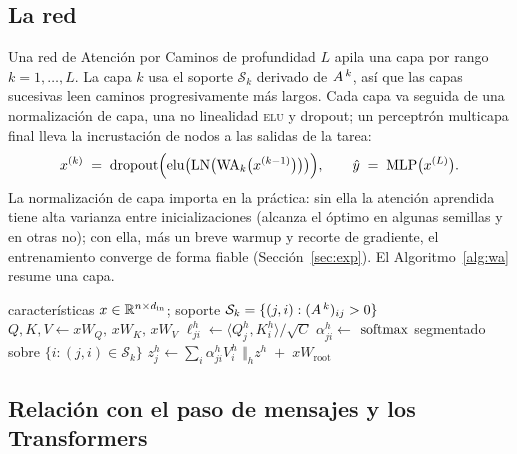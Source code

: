 \subsection{La red}

Una red de Atención por Caminos de profundidad $L$ apila una capa por rango
$k=1,\dots,L$. La capa $k$ usa el soporte $\mathcal{S}_k$ derivado de
$A^{\,k}$, así que las capas sucesivas leen caminos progresivamente más largos. Cada
capa va seguida de una normalización de capa, una no linealidad \textsc{elu} y
dropout; un perceptrón multicapa final lleva la incrustación de nodos a las salidas de la tarea:
\[
  x^{(k)} \;=\; \mathrm{dropout}\Bigl(\mathrm{elu}\bigl(\mathrm{LN}\bigl(
  \mathrm{WA}_k\bigl(x^{(k-1)}\bigr)\bigr)\bigr)\Bigr),\qquad
  \hat y \;=\; \mathrm{MLP}\bigl(x^{(L)}\bigr).
\]
La normalización de capa importa en la práctica: sin ella la atención aprendida tiene
alta varianza entre inicializaciones (alcanza el óptimo en algunas semillas y
en otras no); con ella, más un breve warmup y recorte de
gradiente, el entrenamiento converge de forma fiable (Sección~\ref{sec:exp}).
El Algoritmo~\ref{alg:wa} resume una capa.

\begin{algorithm}[t]
\caption{Capa de Atención por Caminos en el rango $k$ (dispersa).}\label{alg:wa}
\begin{algorithmic}[1]
\Require características $x\in\mathbb{R}^{n\times d_{\text{in}}}$; soporte
  $\mathcal{S}_k=\{(j,i):(A^{\,k})_{ij}>0\}$
\State $Q,K,V \gets xW_Q,\,xW_K,\,xW_V$ 
  \State $\ell^h_{ji}\gets \langle Q^h_j,K^h_i\rangle/\sqrt{C}$
\EndFor
\State $\alpha^h_{ji}\gets$ $\operatorname{softmax}$ segmentado sobre $\{i:(j,i)\in\mathcal{S}_k\}$
\State $z^h_j\gets \sum_i \alpha^h_{ji}V^h_i$
\State \Return $\bigl\Vert_h z^h \;+\; xW_{\!\text{root}}$
\end{algorithmic}
\end{algorithm}

\subsection{Relación con el paso de mensajes y los Transformers}

